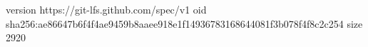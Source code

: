 version https://git-lfs.github.com/spec/v1
oid sha256:ae86647b6f4f4ae9459b8aaee918e1f14936783168644081f3b078f4f8c2c254
size 2920
